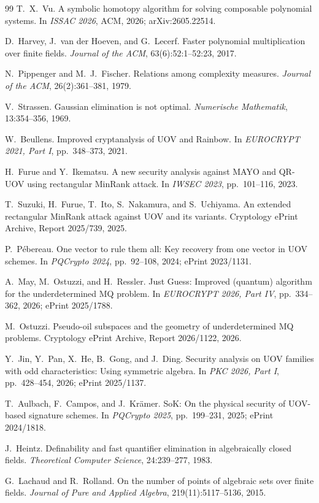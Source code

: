 \documentclass[10pt,a4paper]{article}
\begin{document}
\begin{thebibliography}{99}
T.~X.~Vu.
\newblock A symbolic homotopy algorithm for solving composable polynomial systems.
\newblock In \emph{ISSAC 2026}, ACM, 2026; arXiv:2605.22514.

D.~Harvey, J.~van der Hoeven, and G.~Lecerf.
\newblock Faster polynomial multiplication over finite fields.
\newblock \emph{Journal of the ACM}, 63(6):52:1--52:23, 2017.

N.~Pippenger and M.~J.~Fischer.
\newblock Relations among complexity measures.
\newblock \emph{Journal of the ACM}, 26(2):361--381, 1979.

V.~Strassen.
\newblock Gaussian elimination is not optimal.
\newblock \emph{Numerische Mathematik}, 13:354--356, 1969.

W.~Beullens.
\newblock Improved cryptanalysis of UOV and Rainbow.
\newblock In \emph{EUROCRYPT 2021, Part I}, pp.~348--373, 2021.

H.~Furue and Y.~Ikematsu.
\newblock A new security analysis against MAYO and QR-UOV using rectangular MinRank attack.
\newblock In \emph{IWSEC 2023}, pp.~101--116, 2023.

T.~Suzuki, H.~Furue, T.~Ito, S.~Nakamura, and S.~Uchiyama.
\newblock An extended rectangular MinRank attack against UOV and its variants.
\newblock Cryptology ePrint Archive, Report 2025/739, 2025.

P.~P\'ebereau.
\newblock One vector to rule them all: Key recovery from one vector in UOV schemes.
\newblock In \emph{PQCrypto 2024}, pp.~92--108, 2024; ePrint 2023/1131.

A.~May, M.~Ostuzzi, and H.~Ressler.
\newblock Just Guess: Improved (quantum) algorithm for the underdetermined MQ problem.
\newblock In \emph{EUROCRYPT 2026, Part IV}, pp.~334--362, 2026; ePrint 2025/1788.

M.~Ostuzzi.
\newblock Pseudo-oil subspaces and the geometry of underdetermined MQ problems.
\newblock Cryptology ePrint Archive, Report 2026/1122, 2026.

Y.~Jin, Y.~Pan, X.~He, B.~Gong, and J.~Ding.
\newblock Security analysis on UOV families with odd characteristics: Using symmetric algebra.
\newblock In \emph{PKC 2026, Part I}, pp.~428--454, 2026; ePrint 2025/1137.


T.~Aulbach, F.~Campos, and J.~Kr\"amer.
\newblock SoK: On the physical security of UOV-based signature schemes.
\newblock In \emph{PQCrypto 2025}, pp.~199--231, 2025; ePrint 2024/1818.

J.~Heintz.
\newblock Definability and fast quantifier elimination in algebraically closed fields.
\newblock \emph{Theoretical Computer Science}, 24:239--277, 1983.

G.~Lachaud and R.~Rolland.
\newblock On the number of points of algebraic sets over finite fields.
\newblock \emph{Journal of Pure and Applied Algebra}, 219(11):5117--5136, 2015.

\end{thebibliography}
\end{document}
